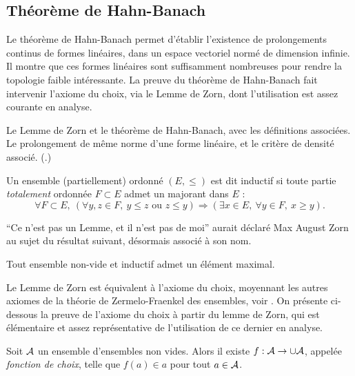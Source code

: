 \subsection{Théorème de Hahn-Banach}
\label{subsec:HahnBanach}

Le théorème de Hahn-Banach permet d'établir l'existence de prolongements continus de formes linéaires, dans un espace vectoriel normé de dimension infinie. Il montre que ces formes linéaires sont suffisamment nombreuses pour rendre la topologie faible intéressante. La preuve du théorème de Hahn-Banach fait intervenir l'axiome du choix, via le Lemme de Zorn, dont l'utilisation est assez courante en analyse.


\begin{retenir}
Le Lemme de Zorn et le théorème de Hahn-Banach, avec les définitions associées. Le prolongement de même norme d'une forme linéaire, et le critère de densité associé.
(.)
\end{retenir}

\begin{definition}
\label{def:inductif}
%
	Un ensemble (partiellement) ordonné $(E, \leq)$ est dit inductif si toute partie \emph{totalement} ordonnée $F\subset E$ admet un majorant dans $E$ : 
	\begin{equation}
		\forall F \subset E,\ (\forall y,z \in F,\ y \leq z \text{ ou } z \leq y) \Rightarrow (\exists x \in E,\ \forall y \in F,\ x \geq y). 
	\end{equation} 
\end{definition}

``Ce n'est pas un Lemme, et il n'est pas de moi'' aurait déclaré Max August Zorn au sujet du résultat suivant, désormais associé à son nom.
\begin{lemma}[Zorn] 
\label{lem:Zorn}
%
	Tout ensemble non-vide et inductif admet un élément maximal. 
\end{lemma}

Le Lemme de Zorn est équivalent à l'axiome du choix, moyennant les autres axiomes de la théorie de Zermelo-Fraenkel des ensembles, voir \cite{krivine2007theorie}. On présente ci-dessous la preuve de l'axiome du choix à partir du lemme de Zorn, qui est élémentaire et assez représentative de l'utilisation de ce dernier en analyse.



\begin{definition}
\label{def:axiomChoix}
%
Soit $\mathcal{A}$ un ensemble d'ensembles non vides. Alors il existe $f : \mathcal{A} \to \cup\mathcal{A}$, appelée \emph{fonction de choix}, telle que $f(a) \in a$ pour tout $a \in \mathcal{A}$. 	
\end{definition}


